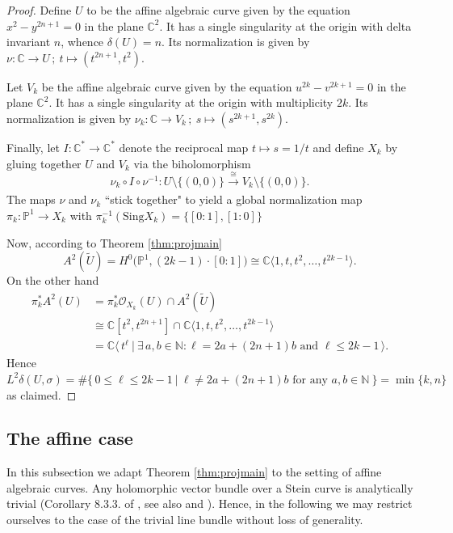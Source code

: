 \documentclass[11pt]{amsart}
\theoremstyle{definition}
\newcommand{\bC}{{\mathbb C}}
\begin{document}
\begin{proof} Define $U$ to be the affine algebraic curve given by the equation $x^2-y^{2n+1} = 0$
in the plane $\bC^2$.
It has a single singularity at the origin with delta invariant $n$, whence $\delta(U) = n$. Its normalization is given by $ \nu : \bC \to U\,;\ t \mapsto (t^{2n+1},t^2)$.

Let $V_k$ be the affine algebraic curve given by the equation $u^{2k} - v^{2k+1} = 0$ in the plane $\bC^2$. It has a single singularity at the origin with multiplicity $2k$. Its normalization is given by $ \nu_k : \bC \to V_k\,;\ s \mapsto (s^{2k+1},s^{2k})$.

Finally, let $I : \bC^* \to \bC^*$ denote the reciprocal map $t \mapsto s = 1/t$ and define $X_k$ by gluing together $U$ and $V_k$ via the biholomorphism
$$\nu_k \circ I \circ \nu^{-1} : U\setminus \{(0,0)\} \xrightarrow[]{\ \cong \ } V_k \setminus \{(0,0)\}.$$
The maps $\nu$ and $\nu_k$ ``stick together" to yield a global normalization map $\pi_k : \mathbb{P}^1 \to X_k$ with $\pi_k^{-1}(\text{Sing}X_k) = \big\{ [0:1],[1:0] \big\}$

Now, according to Theorem \ref{thm:projmain}
$$A^2(\widetilde{U}) = H^0\big(\mathbb{P}^1,(2k-1)\cdot [0:1]\big) \cong \bC\langle 1,t,t^2,\dots,t^{2k-1} \rangle.$$
On the other hand
\begin{align*}
    \pi_k^*A^2(U) &= \pi_k^*\mathcal{O}_{X_k}(U)\cap A^2(\widetilde{U})\\
    &\cong \bC[t^2,t^{2n+1}] \cap \bC\langle 1,t,t^2,\dots,t^{2k-1} \rangle \\
    &= \bC\langle\,t^\ell\ | \ \exists\, a,b\in\mathbb{N} : \ell = 2a+(2n+1)b \text{ and } \ell \leq 2k-1 \, \rangle.
\end{align*}
Hence $L^2\delta(U,\sigma) = \#\{\,0\leq \ell \leq 2k-1 \ | \ \ell \neq 2a+(2n+1)b \text{ for any } a,b \in \mathbb{N} \ \} = \min\{k,n\}$
as claimed. \end{proof}


\subsection{The affine case}\label{ss:aff}

 In this subsection we adapt Theorem \ref{thm:projmain} to the setting of affine algebraic curves. Any holomorphic vector bundle over a Stein curve is analytically trivial (Corollary 8.3.3. of \cite{F17}, see also \cite{G571} and \cite{G572}). Hence, in the following we may restrict ourselves to the case of the trivial line bundle without loss of generality.
\end{document}
